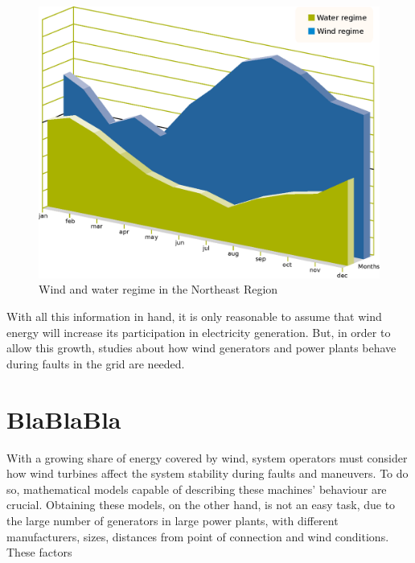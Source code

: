 \begin{figure}
	\caption{Wind and water regime in the Northeast Region}
	\begin{center}
		\includegraphics[scale=0.5]{Images/WindWater.eps}
	\end{center}
	\label{fig: WindWater}
\end{figure}

With all this information in hand, it is only reasonable to assume that wind energy will increase its participation in electricity generation. But, in order to allow this growth, studies about how wind generators and power plants behave during faults in the grid are needed.

\section{BlaBlaBla}

With a growing share of energy covered by wind, system operators must consider how wind turbines affect the system stability during faults and maneuvers. To do so, mathematical models capable of describing these machines' behaviour are crucial. Obtaining these models, on the other hand, is not an easy task, due to the large number of generators in large power plants, with different manufacturers, sizes, distances from point of connection and wind conditions. These factors 
